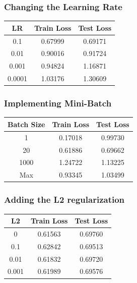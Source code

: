 \documentclass[
	letterpaper, %
	10pt, %
]{class}
\begin{document}
\subsubsection{Changing the Learning Rate}

\begin{center}
    \begin{tabular}{ |c|c|c| }
        \hline
        LR     & Train Loss & Test Loss \\
        \hline
        0.1    & 0.67999    & 0.69171   \\
        0.01   & 0.90016    & 0.91724   \\
        0.001  & 0.94824    & 1.16871   \\
        0.0001 & 1.03176    & 1.30609   \\
        \hline
    \end{tabular}
\end{center}

\subsubsection{Implementing Mini-Batch}

\begin{center}
    \begin{tabular}{ |c|c|c| }
        \hline
        Batch Size & Train Loss & Test Loss \\
        \hline
        1          & 0.17018    & 0.99730   \\
        20         & 0.61886    & 0.69662   \\
        1000       & 1.24722    & 1.13225   \\
        Max        & 0.93345    & 1.03499   \\
        \hline
    \end{tabular}
\end{center}

\subsubsection{Adding the L2 regularization}

\begin{center}
    \begin{tabular}{ |c|c|c| }
        \hline
        L2    & Train Loss & Test Loss \\
        \hline
        0     & 0.61563    & 0.69760   \\
        0.1   & 0.62842    & 0.69513   \\
        0.01  & 0.61832    & 0.69720   \\
        0.001 & 0.61989    & 0.69576   \\
        \hline
    \end{tabular}
\end{center}
\end{document}
